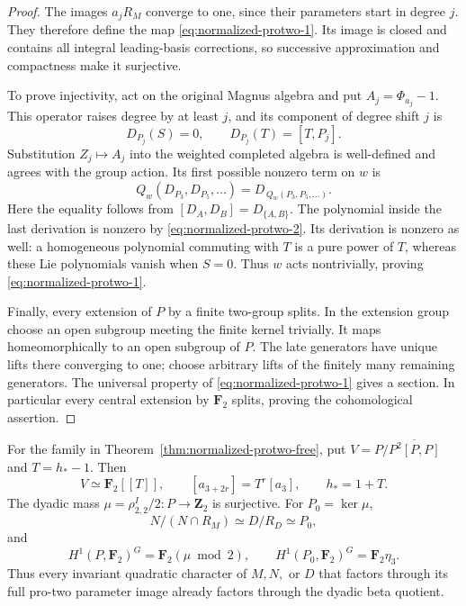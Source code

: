 \begin{proof}
The images \(a_jR_M\) converge to one, since their parameters
start in degree \(j\). They therefore define the map \eqref{eq:normalized-protwo-1}.
Its image is closed and contains all integral leading-basis
corrections, so successive approximation and compactness make
it surjective.

To prove injectivity, act on the original Magnus algebra and put
\(A_j=\Phi_{a_j}-1\).
This operator raises degree by at least \(j\), and its component
of degree shift \(j\) is
\[
 D_{P_j}(S)=0,\qquad D_{P_j}(T)=[T,P_j].
\]
Substitution \(Z_j\mapsto A_j\) into the weighted completed
algebra is well-defined and agrees with the group
action. Its first possible nonzero term on \(w\) is
\[
 Q_w(D_{P_3},D_{P_5},\ldots)
    =D_{\,Q_w(P_3,P_5,\ldots)}.
\]
Here the equality follows from
\([D_A,D_B]=D_{\{A,B\}}\).
The polynomial inside the last derivation is nonzero by \eqref{eq:normalized-protwo-2}.
Its derivation is nonzero as well: a homogeneous polynomial
commuting with \(T\) is a pure power of \(T\), whereas these Lie
polynomials vanish when \(S=0\).
Thus \(w\) acts nontrivially, proving \eqref{eq:normalized-protwo-1}.

Finally, every extension of \(P\) by a finite two-group splits.
In the extension group choose an open subgroup meeting the
finite kernel trivially. It maps homeomorphically to an open
subgroup of \(P\).
The late generators have unique lifts there converging to one;
choose arbitrary lifts of the finitely many remaining
generators. The universal property of \eqref{eq:normalized-protwo-1} gives a section.
In particular every central extension by \(\mathbf F_2\)
splits, proving the cohomological assertion.
\end{proof}

\begin{corollary}
\label{cor:protwo-image-invariant-characters}
For the family in Theorem~\ref{thm:normalized-protwo-free}, put
\(V=P/\overline{P^2[P,P]}\) and \(T=h_*-1\).
Then
\begin{equation}
 V\simeq\mathbf F_2[[T]],\qquad
 [a_{3+2r}]=T^r[a_3],\qquad h_*=1+T.                   \label{eq:normalized-protwo-3}
\end{equation}
The dyadic mass
\(\mu=\rho_{2,2}^I/2:P\to\mathbf Z_2\) is surjective.
For \(P_0=\ker\mu\),
\begin{equation}
 N/(N\cap R_M)\simeq D/R_D\simeq P_0,                  \label{eq:normalized-protwo-4}
\end{equation}
and
\begin{equation}
 H^1(P,\mathbf F_2)^G=\mathbf F_2(\mu\bmod2),
 \qquad
 H^1(P_0,\mathbf F_2)^G=\mathbf F_2\eta_3.             \label{eq:normalized-protwo-5}
\end{equation}
Thus every invariant quadratic character of \(M,N,\) or \(D\)
that factors through its full pro-two parameter image already
factors through the dyadic beta quotient.
\end{corollary}

